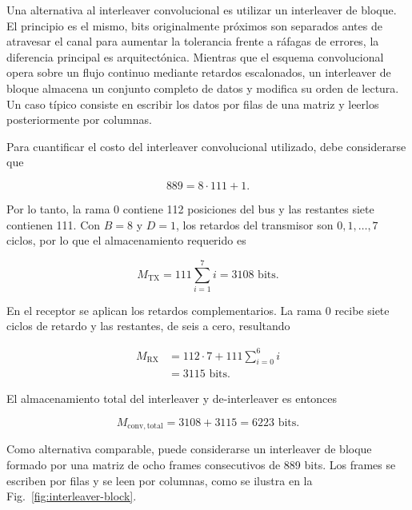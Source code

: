 \documentclass[10pt,a4paper]{article}
\begin{document}
Una alternativa al interleaver convolucional es utilizar un interleaver de
bloque. El principio es el mismo, bits originalmente próximos son separados
antes de atravesar el canal para aumentar la tolerancia frente a ráfagas de
errores, la diferencia principal es arquitectónica. Mientras que el esquema
convolucional opera sobre un flujo continuo mediante retardos escalonados, un
interleaver de bloque almacena un conjunto completo de datos y modifica su
orden de lectura. Un caso típico consiste en escribir los datos por filas de
una matriz y leerlos posteriormente por columnas.

Para cuantificar el costo del interleaver convolucional utilizado, debe
considerarse que

\begin{equation}
    889 = 8\cdot111+1.
\end{equation}

Por lo tanto, la rama 0 contiene 112 posiciones del bus y las restantes siete
contienen 111. Con $B=8$ y $D=1$, los retardos del transmisor son
$0,1,\ldots,7$ ciclos, por lo que el almacenamiento requerido es

\begin{equation}
    M_{\mathrm{TX}}
    =
    111\sum_{i=1}^{7}i
    =
    3108\text{ bits}.
    \label{eq:memoria-conv-tx}
\end{equation}

En el receptor se aplican los retardos complementarios. La rama 0 recibe siete
ciclos de retardo y las restantes, de seis a cero, resultando

\begin{equation}
\begin{aligned}
    M_{\mathrm{RX}}
    &=
    112\cdot7
    +
    111\sum_{i=0}^{6}i \\
    &=
    3115\text{ bits}.
\end{aligned}
\label{eq:memoria-conv-rx}
\end{equation}

El almacenamiento total del interleaver y de-interleaver es entonces

\begin{equation}
    M_{\mathrm{conv,total}}
    =
    3108+3115
    =
    6223\text{ bits}.
\end{equation}

Como alternativa comparable, puede considerarse un interleaver de bloque
formado por una matriz de ocho frames consecutivos de 889 bits. Los frames se
escriben por filas y se leen por columnas, como se ilustra en la
Fig.~\ref{fig:interleaver-block}.
\end{document}
